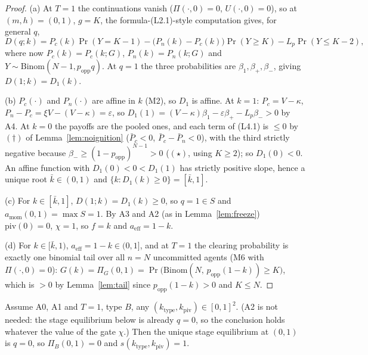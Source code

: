 \begin{proof}
(a) At $T=1$ the continuations vanish ($\Pi(\cdot,0)=0$, $U(\cdot,0)=0$), so at
$(m,h)=(0,1)$, $g=K$, the formula-(L2.1)-style computation gives, for general $q$,
\begin{equation}
D(q;k)=P_c(k)\Pr(Y=K-1)-\big(P_n(k)-P_c(k)\big)\Pr(Y\ge K)-L_p\Pr(Y\le K-2),\tag{L4.1}
\end{equation}
where now $P_c(k)=P_c(k;G)$, $P_n(k)=P_n(k;G)$ and $Y\sim\mathrm{Binom}(N-1,p_{\mathrm{opp}}q)$.
At $q=1$ the three probabilities are $\beta_1,\beta_+,\beta_-$, giving $D(1;k)=D_1(k)$.

(b) $P_c(\cdot)$ and $P_n(\cdot)$ are affine in $k$ (M2), so $D_1$ is affine. At $k=1$:
$P_c=V-\kappa$, $P_n-P_c=\xi V-(V-\kappa)=\varepsilon$, so
$D_1(1)=(V-\kappa)\beta_1-\varepsilon\beta_+-L_p\beta_->0$ by A4. At $k=0$ the payoffs are the
pooled ones, and each term of (L4.1) is $\le 0$ by $(\dagger)$ of
Lemma~\ref{lem:noignition} ($\bar P_c<0$, $\bar P_c-\bar P_n<0$), with the third strictly
negative because $\beta_-\ge(1-p_{\mathrm{opp}})^{N-1}>0$ ($(\star)$, using $K\ge 2$); so
$D_1(0)<0$. An affine function with $D_1(0)<0<D_1(1)$ has strictly positive slope, hence a
unique root $\bar k\in(0,1)$ and $\{k:D_1(k)\ge 0\}=[\bar k,1]$.

(c) For $k\in[\bar k,1]$, $D(1;k)=D_1(k)\ge 0$, so $q=1\in S$ and
$a_{\mathrm{mom}}(0,1)=\max S=1$. By A3 and A2 (as in Lemma~\ref{lem:freeze})
$\mathrm{piv}(0)=0$, $\chi=1$, so $f=k$ and $a_{\mathrm{eff}}=1-k$.

(d) For $k\in[\bar k,1)$, $a_{\mathrm{eff}}=1-k\in(0,1]$, and at $T=1$ the clearing
probability is exactly one binomial tail over all $n=N$ uncommitted agents (M6 with
$\Pi(\cdot,0)=0$):
$G(k)=\Pi_G(0,1)=\Pr\big(\mathrm{Binom}(N,\,p_{\mathrm{opp}}(1-k))\ge K\big)$, which is $>0$
by Lemma~\ref{lem:tail} since $p_{\mathrm{opp}}(1-k)>0$ and $K\le N$.
\end{proof}

\begin{lemma}[bad coalitions never ignite at $T=1$, at any dial setting]\label{lem:bad}
Assume A0, A1 and $T=1$, type $B$, any $(k_{\mathrm{type}},k_{\mathrm{piv}})\in[0,1]^2$. (A2
is not needed: the stage equilibrium below is already $q=0$, so the conclusion holds whatever
the value of the gate $\chi$.) Then the unique stage equilibrium at $(0,1)$ is $q=0$, so
$\Pi_B(0,1)=0$ and $s(k_{\mathrm{type}},k_{\mathrm{piv}})=1$.
\end{lemma}

